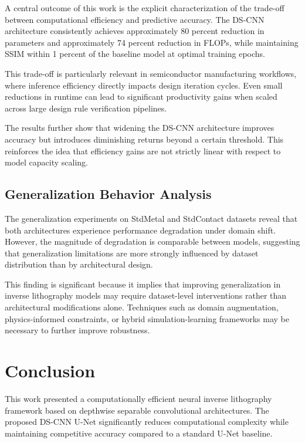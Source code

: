 \documentclass[conference]{IEEEtran}
\begin{document}
A central outcome of this work is the explicit characterization of the trade-off between computational efficiency and predictive accuracy. The DS-CNN architecture consistently achieves approximately 80 percent reduction in parameters and approximately 74 percent reduction in FLOPs, while maintaining SSIM within 1 percent of the baseline model at optimal training epochs.

This trade-off is particularly relevant in semiconductor manufacturing workflows, where inference efficiency directly impacts design iteration cycles. Even small reductions in runtime can lead to significant productivity gains when scaled across large design rule verification pipelines.



The results further show that widening the DS-CNN architecture improves accuracy but introduces diminishing returns beyond a certain threshold. This reinforces the idea that efficiency gains are not strictly linear with respect to model capacity scaling.

\subsection{\textbf{Generalization Behavior Analysis}}

The generalization experiments on StdMetal and StdContact datasets reveal that both architectures experience performance degradation under domain shift. However, the magnitude of degradation is comparable between models, suggesting that generalization limitations are more strongly influenced by dataset distribution than by architectural design.

This finding is significant because it implies that improving generalization in inverse lithography models may require dataset-level interventions rather than architectural modifications alone. Techniques such as domain augmentation, physics-informed constraints, or hybrid simulation-learning frameworks may be necessary to further improve robustness.










\section{\textbf{Conclusion}}

This work presented a computationally efficient neural inverse lithography framework based on depthwise separable convolutional architectures. The proposed DS-CNN U-Net significantly reduces computational complexity while maintaining competitive accuracy compared to a standard U-Net baseline.
\end{document}

